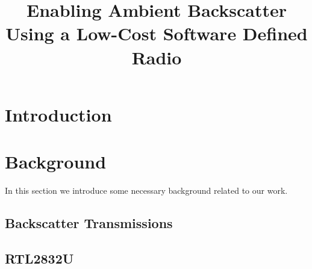 \documentclass[conference]{IEEEtran}
\begin{document}
\title{Enabling Ambient Backscatter \\Using a Low-Cost Software Defined Radio}

\author{
}

\maketitle

\begin{abstract}



\end{abstract}

\IEEEpeerreviewmaketitle



\section{Introduction}


\section{Background}

In this section we introduce some necessary background related to our
work. 

\subsection{Backscatter Transmissions}


\subsection{RTL2832U}
\label{sub:rtl2832}
\end{document}
